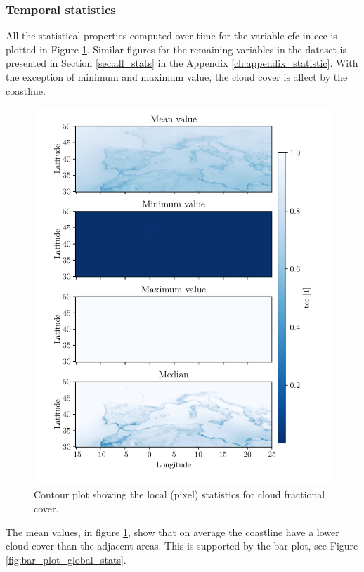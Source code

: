 \subsubsection{Temporal statistics}
All the statistical properties computed over time for the variable \acrshort{cfc} in \acrshort{ecc} is plotted in 
Figure \ref{fig:all_stats_tcc}. Similar figures for the remaining variables in the dataset is presented in Section \ref{sec:all_stats} in the Appendix \ref{ch:appendix_statistic}. With the exception of minimum and maximum value, the cloud cover is affect by the coastline. 
\begin{figure}[ht]
    \centering
    \includegraphics{python_figs/all_stat_variable_tcc.pdf}
    \caption{Contour plot showing the local (pixel) statistics for cloud fractional cover.}
    \label{fig:all_stats_tcc}
\end{figure}

The mean values, in figure \ref{fig:all_stats_tcc}, show that on average the coastline have a lower cloud cover than the adjacent areas. This is supported by the bar plot, see Figure \ref{fig:bar_plot_global_stats}. 

